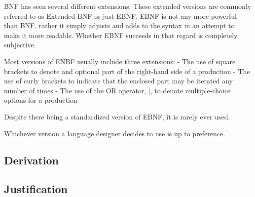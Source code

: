 BNF has seen several different extensions.
These extended versions are commonly referred to as Extended BNF or just EBNF.
EBNF is not any more powerful than BNF, rather it simply adjusts and adds to the syntax in an attempt to make it more readable.
Whether EBNF succeeds in that regard is completely subjective.

Most versions of ENBF usually include three extensions:
- The use of square brackets to denote and optional part of the right-hand side of a production
- The use of curly brackets to indicate that the enclosed part may be iterated any number of times
- The use of the OR operator, |, to denote multiple-choice options for a production

Despite there being a standardized version of EBNF, it is rarely ever used.

Whichever version a language designer decides to use is up to preference.

\subsection{Derivation}


\subsection{Justification}

